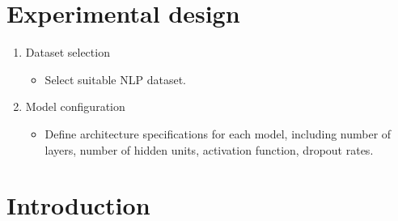 \documentclass[12pt,a4paper]{article}
\begin{document}
\section{Experimental design}
\begin{enumerate}
    \item Dataset selection
    \begin{itemize}
        \item Select suitable NLP dataset.
    \end{itemize}
    
    \item Model configuration
    \begin{itemize}
        \item Define architecture specifications for each model, including number of layers, number of hidden units, activation function, dropout rates.
    \end{itemize}
\end{enumerate}


\newpage
\section{Introduction}
\end{document}
